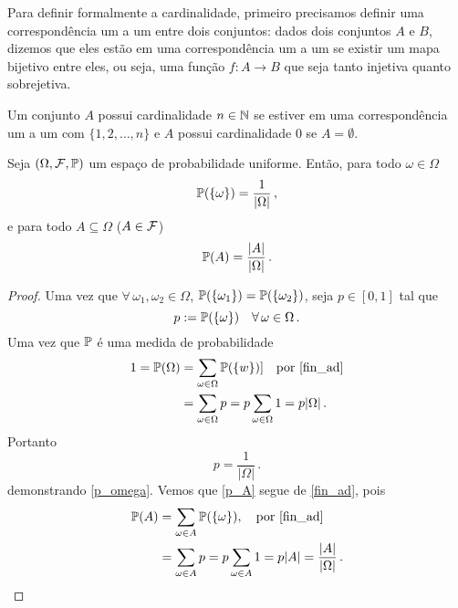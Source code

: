 Para definir formalmente a cardinalidade, primeiro precisamos definir uma correspondência um a um entre dois conjuntos: dados dois conjuntos $A$ e $B$, dizemos que eles estão em uma correspondência um a um se existir um mapa bijetivo entre eles, ou seja, uma função $f:A \to B$ que seja tanto injetiva quanto sobrejetiva.

\begin{definition}
Um conjunto $A$ possui cardinalidade $n \in \mathbb{N}$ se estiver em uma correspondência um a um com $\{1,2,\dots,n\}$ e $A$ possui cardinalidade $0$ se $A = \emptyset$.
\end{definition}

\begin{proposition}
Seja $(\Omega,\mathcal F,\mathbb{P})$ um espaço de probabilidade uniforme. Então, para todo $\omega \in \Omega$
\begin{equation}
\mathbb{P}(\{\omega\})= \frac{1}{|\Omega|} \, ,\label{p_omega}
\end{equation}
e para todo $A \subseteq \Omega$ ($A \in \mathcal F$)
\begin{equation}
\label{p_A}
\mathbb{P}(A)= \frac{|A|}{|\Omega|} \, .
\end{equation}
\label{prob_prop}
\end{proposition}

\begin{proof}
Uma vez que $\forall \, \omega_1, \omega_2 \in \Omega$, $\mathbb{P}(\{\omega_1\})=\mathbb{P}(\{\omega_2\})$, seja $p \in [0,1]$ tal que
\begin{equation}
p:= \mathbb{P}(\{\omega\}) \quad \forall \, \omega \in \Omega \,.
\end{equation}
Uma vez que $\mathbb{P}$ é uma medida de probabilidade 
\begin{align}
 1= \Pb(\Omega) &= 
{\sum_{\omega \in \Omega} \Pb(\{w\})]} \quad \text{por \eqref{fin_ad}}\\
&={\sum_{\omega \in \Omega} p = p \sum_{\omega \in \Omega} 1 = p |\Omega| \,.} %
\end{align}
Portanto 
\begin{equation}
p= \frac{1}{|\Omega|} \,.
\end{equation}
demonstrando \eqref{p_omega}.
Vemos que \eqref{p_A} segue de \eqref{fin_ad}, pois 
\begin{align}
\mathbb{P}(A) &= \sum_{\omega \in A} \mathbb{P}(\{\omega\}), \quad \text{por \eqref{fin_ad}} \\
&=\sum_{\omega \in A} p = p \sum_{\omega \in A} 1 = p |A|= \frac{|A|}{|\Omega|} \,.
\qedhere
\end{align}
\end{proof}

